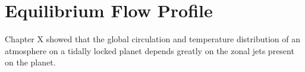 %
%
%
%
%
%
%
%
%



\section{Equilibrium Flow Profile}

Chapter X showed that the global circulation and temperature distribution of an atmosphere on a tidally locked planet depends greatly on the zonal jets present on the planet.

